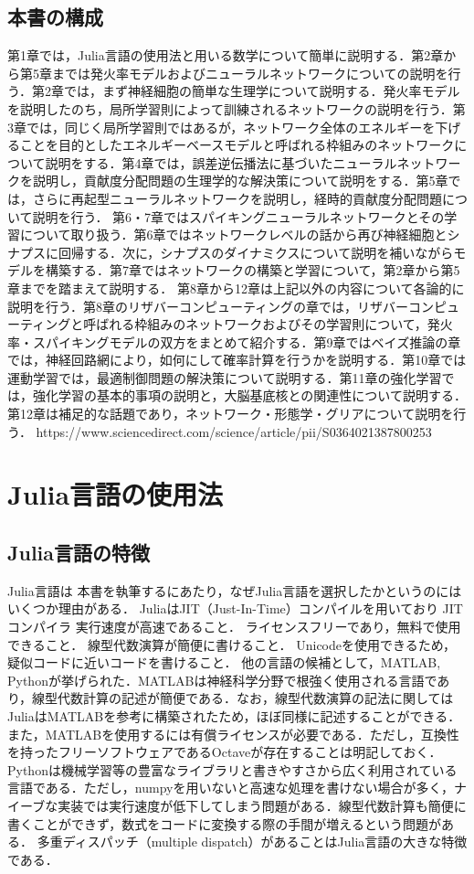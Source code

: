 \subsection{本書の構成}
第1章では，Julia言語の使用法と用いる数学について簡単に説明する．第2章から第5章までは発火率モデルおよびニューラルネットワークについての説明を行う．第2章では，まず神経細胞の簡単な生理学について説明する．発火率モデルを説明したのち，局所学習則によって訓練されるネットワークの説明を行う．第3章では，同じく局所学習則ではあるが，ネットワーク全体のエネルギーを下げることを目的としたエネルギーベースモデルと呼ばれる枠組みのネットワークについて説明をする．第4章では，誤差逆伝播法に基づいたニューラルネットワークを説明し，貢献度分配問題の生理学的な解決策について説明をする．第5章では，さらに再起型ニューラルネットワークを説明し，経時的貢献度分配問題について説明を行う．
第6・7章ではスパイキングニューラルネットワークとその学習について取り扱う．第6章ではネットワークレベルの話から再び神経細胞とシナプスに回帰する．次に，シナプスのダイナミクスについて説明を補いながらモデルを構築する．第7章ではネットワークの構築と学習について，第2章から第5章までを踏まえて説明する．
第8章から12章は上記以外の内容について各論的に説明を行う．第8章のリザバーコンピューティングの章では，リザバーコンピューティングと呼ばれる枠組みのネットワークおよびその学習則について，発火率・スパイキングモデルの双方をまとめて紹介する．第9章ではベイズ推論の章では，神経回路網により，如何にして確率計算を行うかを説明する．第10章では運動学習では，最適制御問題の解決策について説明する．第11章の強化学習では，強化学習の基本的事項の説明と，大脳基底核との関連性について説明する．第12章は補足的な話題であり，ネットワーク・形態学・グリアについて説明を行う．
https://www.sciencedirect.com/science/article/pii/S0364021387800253
\section{Julia言語の使用法}
\subsection{Julia言語の特徴}
Julia言語は
本書を執筆するにあたり，なぜJulia言語を選択したかというのにはいくつか理由がある．
JuliaはJIT（Just-In-Time）コンパイルを用いており
JITコンパイラ
実行速度が高速であること．
ライセンスフリーであり，無料で使用できること．
線型代数演算が簡便に書けること．
Unicodeを使用できるため，疑似コードに近いコードを書けること．
他の言語の候補として，MATLAB, Pythonが挙げられた．MATLABは神経科学分野で根強く使用される言語であり，線型代数計算の記述が簡便である．なお，線型代数演算の記法に関してはJuliaはMATLABを参考に構築されたため，ほぼ同様に記述することができる．また，MATLABを使用するには有償ライセンスが必要である．ただし，互換性を持ったフリーソフトウェアであるOctaveが存在することは明記しておく．
Pythonは機械学習等の豊富なライブラリと書きやすさから広く利用されている言語である．ただし，numpyを用いないと高速な処理を書けない場合が多く，ナイーブな実装では実行速度が低下してしまう問題がある．線型代数計算も簡便に書くことができず，数式をコードに変換する際の手間が増えるという問題がある．
多重ディスパッチ（multiple dispatch）があることはJulia言語の大きな特徴である．
